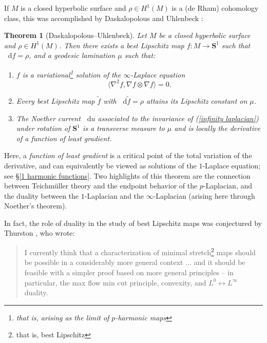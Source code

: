 \documentclass[reqno,11pt]{amsart}
\newcommand{\Sph}{\mathbf S}
\newcommand*\dif{\mathop{}\!\mathrm{d}}
\newcommand{\dfn}[1]{\emph{#1}\index{#1}}
\newtheorem{theorem}{Theorem}[section]
\theoremstyle{definition}
\numberwithin{equation}{section}
\begin{document}
If $M$ is a closed hyperbolic surface and $\rho \in H^1(M)$ is a (de Rham) cohomology class, this was accomplished by Daskalopolous and Uhlenbeck \cite{daskalopoulos2020transverse}:

\begin{theorem}[Daskalopolous--Uhlenbeck]\label{DU20}
Let $M$ be a closed hyperbolic surface and $\rho \in H^1(M)$.
Then there exists a best Lipschitz map $f: M \to \Sph^1$ such that $\dif f = \rho$, and a geodesic lamination $\mu$ such that:
\begin{enumerate}
\item $f$ is a variational\footnote{that is, arising as the limit of $p$-harmonic maps} solution of the $\infty$-Laplace equation
\begin{equation}\label{infinity laplacian}
	\langle \nabla^2 f, \nabla f \otimes \nabla f\rangle = 0.
\end{equation}
\item Every best Lipschitz map $\tilde f$ with $\dif \tilde f = \rho$ attains its Lipschitz constant on $\mu$.
\item The Noether current $\dif u$ associated to the invariance of (\ref{infinity laplacian}) under rotation of $\Sph^1$ is a transverse measure to $\mu$ and is locally the derivative of a function of least gradient.
\end{enumerate}
\end{theorem}

Here, a \dfn{function of least gradient} is a critical point of the total variation of the derivative, and can equivalently be viewed as solutions of the $1$-Laplace equation; see \S\ref{1 harmonic functions}.
Two highlights of this theorem are the connection between Teichm\"uller theory and the endpoint behavior of the $p$-Laplacian, and the duality between the $1$-Laplacian and the $\infty$-Laplacian (arising here through Noether's theorem).

In fact, the role of duality in the study of best Lipschitz maps was conjectured by Thurston \cite[Abstract]{Thurston98}, who wrote:

\begin{quote}
I currently think that a characterization of minimal stretch\footnote{that is, best Lipschitz} maps should be possible in a considerably more general context ... and it should be feasible with a simpler proof based on more general principles -- in particular, the max flow min cut principle, convexity, and $L^0 \leftrightarrow L^\infty$ duality.
\end{quote}
\end{document}

